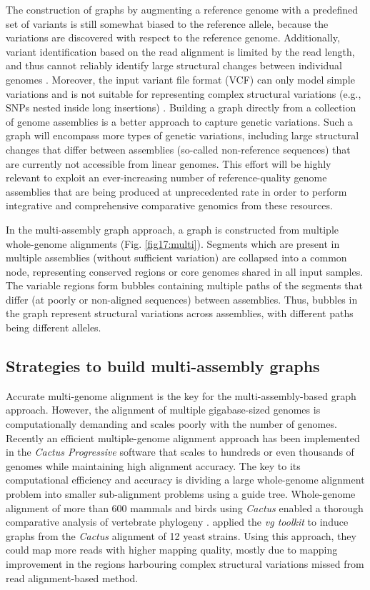 \documentclass[../main.tex]{subfiles}
\begin{document}
The construction of graphs by augmenting a reference genome with a predefined set of variants is still somewhat biased to the reference allele, because the variations are discovered with respect to the reference genome. Additionally, variant identification based on the read alignment is limited by the read length, and thus cannot reliably identify large structural changes between individual genomes \citep{feng2020higher}. Moreover, the input variant file format (VCF) can only model simple variations and is not suitable for representing complex structural variations (e.g., SNPs nested inside long insertions) \citep{letcher2021enabling}.  Building a graph directly from a collection of genome assemblies is a better approach to capture  genetic variations. Such a graph will encompass more types of genetic variations, including large structural changes that differ between assemblies (so-called non-reference sequences) that are currently not accessible from linear genomes. This effort will be highly relevant to exploit an ever-increasing number of reference-quality genome assemblies that are being produced at unprecedented rate in order to perform integrative and comprehensive comparative genomics from these resources. 

In the multi-assembly graph approach, a graph is constructed from  multiple whole-genome alignments (Fig. \ref{fig17:multi}). Segments which are present in multiple assemblies (without sufficient variation) are collapsed into a common node, representing conserved regions or core genomes shared in all input samples. The variable regions form bubbles containing multiple paths of the segments that differ (at poorly or non-aligned sequences) between assemblies. Thus, bubbles in the graph represent structural variations across assemblies, with different paths being different alleles. 

\subsection*{Strategies to build multi-assembly graphs}

Accurate multi-genome alignment is the key for the multi-assembly-based graph approach. However, the alignment of multiple gigabase-sized genomes is computationally demanding and scales poorly with the number of genomes. Recently an efficient multiple-genome alignment approach has been implemented in the \emph{Cactus Progressive} software \citep{armstrong2020progressive} that scales to hundreds or even  thousands of genomes while maintaining high alignment accuracy. The key to its computational efficiency and accuracy is dividing a large whole-genome alignment problem into smaller sub-alignment problems using a guide tree. Whole-genome alignment of more than 600 mammals and birds using \emph{Cactus} enabled a thorough comparative analysis of vertebrate phylogeny \citep{feng2020dense}.
\citet{hickey2020genotyping} applied the \emph{vg toolkit} to induce graphs from the \emph{Cactus} alignment of 12 yeast strains. Using this approach, they could map more reads with higher mapping quality, mostly due to mapping improvement in the regions harbouring complex structural variations missed from read alignment-based method. 
\end{document}
